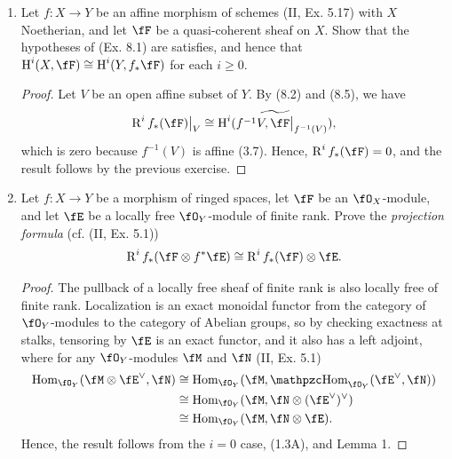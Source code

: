 \documentclass[a4paper]{article}
\begin{document}
\begin{enumerate} [label=\textbf{\arabic*.}, leftmargin=0em]
  \item Let $f : X \to Y$ be an affine morphism of schemes (II, Ex. 5.17) with $X$ Noetherian, and let $\fF$ be a quasi-coherent sheaf on $X$.
        Show that the hypotheses of (Ex. 8.1) are satisfies, and hence that $\cH^i(X, \fF) \cong \cH^i(Y, f_* \fF)$ for each $i \geq 0$.

        \begin{proof}
          Let $V$ be an open affine subset of $Y$.
          By (8.2) and (8.5), we have
          \begin{equation*}
            \restr{\dR^i f_*(\fF)}{V} \cong \widetilde{\cH^i(f^{-1}V, \restr{\fF}{f^{-1}(V)})},
          \end{equation*}
          which is zero because $f^{-1}(V)$ is affine (3.7).
          Hence, $\dR^i f_*(\fF) = 0$, and the result follows by the previous exercise.
        \end{proof}

  \item Let $f : X \to Y$ be a morphism of ringed spaces, let $\fF$ be an $\fO_X$-module, and let $\fE$ be a locally free $\fO_Y$-module of finite rank.
        Prove the \textit{projection formula} (cf. (II, Ex. 5.1))
        \begin{equation*}
          \dR^if_*(\fF \otimes f^* \fE) \cong \dR^i f_*(\fF) \otimes \fE.
        \end{equation*}

        \begin{proof}
          The pullback of a locally free sheaf of finite rank is also locally free of finite rank.
          Localization is an exact monoidal functor from the category of $\fO_Y$-modules to the category of Abelian groups, so by checking exactness at stalks, tensoring by $\fE$ is an exact functor, and it also has a left adjoint, where for any $\fO_Y$-modules $\fM$ and $\fN$ (II, Ex. 5.1)
          \begin{align*}
            \Hom_{\fO_Y}(\fM \otimes \fE^\vee, \fN) & \cong \Hom_{\fO_Y}(\fM, \rHom_{\fO_Y}(\fE^\vee, \fN)) \\
                                                    & \cong \Hom_{\fO_Y}(\fM, \fN \otimes (\fE^\vee)^\vee)  \\
                                                    & \cong \Hom_{\fO_Y}(\fM, \fN \otimes \fE).
          \end{align*}
          Hence, the result follows from the $i = 0$ case, (1.3A), and Lemma 1.


\end{proof}
\end{enumerate}
\end{document}
